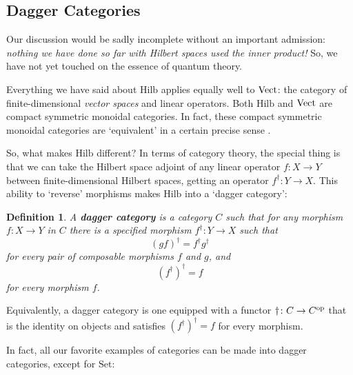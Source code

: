\documentclass[12pt,twoside,openright]{report}
\newtheorem{definition}[thm]{Definition}
\newcommand{\Hilb}{\mathrm{Hilb}}
\newcommand{\Set}{\mathrm{Set}}
\newcommand{\Vect}{{\rm Vect}}
\newcommand{\maps}{\colon}
\newcommand{\op}{{\rm op}}
\begin{document}
\subsection{Dagger Categories}
\label{dagger}

Our discussion would be sadly incomplete without an important admission: {\it nothing we have done so far with Hilbert spaces used the inner product!}   So, we have not yet touched on the essence of quantum theory.

Everything we have said about $\Hilb$ applies equally well to $\Vect$:
the category of finite-dimensional {\it vector spaces} and linear operators.  Both $\Hilb$ and $\Vect$ are compact symmetric monoidal categories.  In fact, these compact symmetric monoidal categories are
`equivalent' in a certain precise sense \cite{MacLane2}.

So, what makes $\Hilb$ different?  In terms of category theory, the special thing is that we can take the Hilbert space adjoint of any linear operator $f \maps X \to Y$ between finite-dimensional Hilbert spaces, getting an operator $f^\dagger \maps Y \to X$.  This ability to `reverse' morphisms makes $\Hilb$ into a `dagger category':

\begin{definition}
A {\bf dagger category} is a category $C$ such that for any morphism
$f \maps X \to Y$ in $C$ there is a specified morphism $f^\dagger \maps Y \to X$ such that
\[  (gf)^\dagger = f^\dagger g^\dagger  \]
for every pair of composable morphisms $f$ and $g$, and 
\[       (f^\dagger)^\dagger = f  \]
for every morphism $f$.
\end{definition}
Equivalently, a dagger category is one equipped with a functor $\dagger \maps C \to C^\op$ 
that is the identity on objects and satisfies 
$(f^\dagger)^\dagger = f$ for every morphism.

In fact, all our favorite examples of categories can be made into dagger categories, except for $\Set$:
\end{document}
